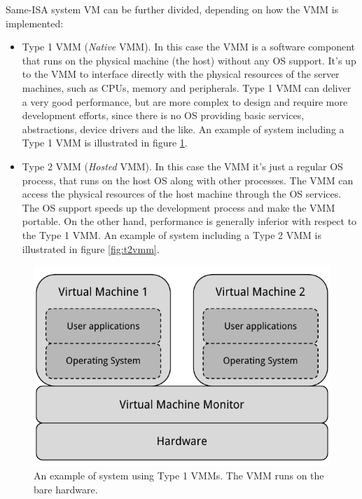 Same-ISA system VM can be further divided, depending on how the VMM is implemented:
\begin{itemize}
    \item Type 1 VMM (\emph{Native} VMM). In this case the VMM is a software component that runs on the physical machine (the host) 
	  without any OS support.
	  It's up to the VMM to interface directly with the physical resources of the server machines, such as
	  CPUs, memory and peripherals. Type 1 VMM can deliver a very good performance, but are more complex to design and require
	  more development efforts, since there is no OS providing basic services, abstractions, device drivers and the like.
	  An example of system including a Type 1 VMM is illustrated in figure \ref{fig:t1vmm}.
	  
    \item Type 2 VMM (\emph{Hosted} VMM). In this case the VMM it's just a regular OS process, that runs on the host OS along with other
	  processes. The VMM can access the physical resources of the host machine through the OS services. The OS support speeds up
	  the development process and make the VMM portable. On the other hand, performance is generally inferior with respect to the
	  Type 1 VMM. An example of system including a Type 2 VMM is illustrated in figure \ref{fig:t2vmm}.
\end{itemize}

\begin{figure}[bt]
\centering
\includegraphics[scale = 1.0]{type-1-vmm.pdf}
\caption{An example of system using Type 1 VMMs. The VMM runs on the bare hardware.}
\label{fig:t1vmm}
\end{figure}


